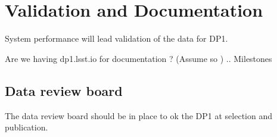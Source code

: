 \section{Validation and Documentation} \label{sec:validation}
System performance will lead validation of the data for DP1.

Are we having dp1.lsst.io  for documentation ? (Assume so ) ..
Milestones

\subsection{Data review board}
The data review board should be in place to ok the DP1 at selection and publication.

